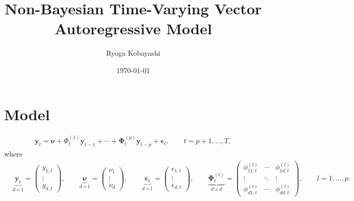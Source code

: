 \documentclass[fleqn]{article}
\title{Non-Bayesian Time-Varying Vector Autoregressive Model}
\date{\today}
\author{Ryoga Kobayashi}
\begin{document}
\maketitle

\section{Model}

\begin{align*}
    \bm y_t = \bm \nu + \Phi^{(1)}_{t} \bm y_{t-1} + \cdots + \bm \Phi^{(p)}_{t} \bm y_{t-p} + \bm \epsilon_t, \qquad t = p+1, \dots, T,
\end{align*}
where
\begin{align*}
    & \underbrace{\bm y_t}_{d \times 1} = \begin{pmatrix}
        y_{1, t} \\
        \vdots \\
        y_{d, t}
    \end{pmatrix},
    \qquad
    \underbrace{\bm \nu}_{d \times 1} = \begin{pmatrix}
        \nu_1 \\
        \vdots \\
        \nu_d
    \end{pmatrix},
    \qquad
    \underbrace{\bm \epsilon_t}_{d \times 1} = \begin{pmatrix}
        \epsilon_{1, t} \\
        \vdots \\
        \epsilon_{d, t}
    \end{pmatrix},
    \qquad
    \underbrace{\bm \Phi^{(l)}_t}_{d \times d} = \begin{pmatrix}
        \phi^{(l)}_{11, t} & \cdots & \phi^{(l)}_{1d, t} \\
        \vdots & \ddots & \vdots \\
        \phi^{(l)}_{d1, t} & \cdots & \phi^{(l)}_{dd, t}
    \end{pmatrix},
    \qquad
    l = 1, \dots, p.
\end{align*}
\end{document}

